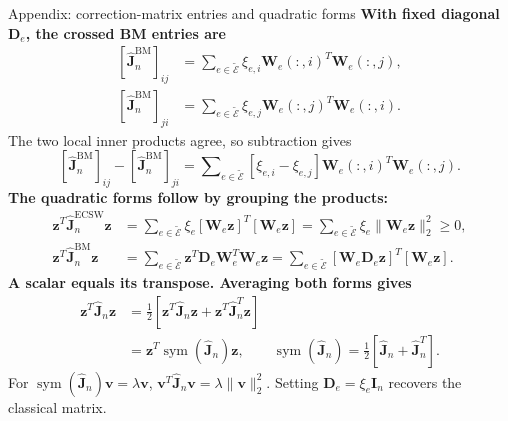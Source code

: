 \documentclass[aspectratio=169]{beamer}
\newcommand{\vect}[1]{\boldsymbol{#1}}
\newcommand{\matr}[1]{\boldsymbol{#1}}
\begin{document}
\begin{frame}{Appendix: correction-matrix entries and quadratic forms}
\hypertarget{bmecsw-correction-calculations}{}
\fontsize{9}{10.5}\selectfont
\setlength{\parskip}{0pt}
\setlength{\abovedisplayskip}{2pt}
\setlength{\belowdisplayskip}{2pt}
\setlength{\abovedisplayshortskip}{2pt}
\setlength{\belowdisplayshortskip}{2pt}
\textbf{With fixed diagonal $\matr{D}_e$, the crossed BM entries are}
\[
\begin{aligned}
 \left[\widehat{\matr{J}}_n^{\mathrm{BM}}\right]_{ij}
 &=\sum\nolimits_{e\in\widetilde{\mathcal E}}\xi_{e,i}\matr{W}_e(:,i)^T\matr{W}_e(:,j),\\
 \left[\widehat{\matr{J}}_n^{\mathrm{BM}}\right]_{ji}
 &=\sum\nolimits_{e\in\widetilde{\mathcal E}}\xi_{e,j}\matr{W}_e(:,j)^T\matr{W}_e(:,i).
\end{aligned}
\]
The two local inner products agree, so subtraction gives
\[
 [\widehat{\matr{J}}_n^{\mathrm{BM}}]_{ij}
 -[\widehat{\matr{J}}_n^{\mathrm{BM}}]_{ji}
 =\sum\nolimits_{e\in\widetilde{\mathcal E}}[\xi_{e,i}-\xi_{e,j}]
 \matr{W}_e(:,i)^T\matr{W}_e(:,j).
\]
\textbf{The quadratic forms follow by grouping the products:}
\[
\begin{aligned}
 \vect{z}^T\widehat{\matr{J}}_n^{\mathrm{ECSW}}\vect{z}
 &=\sum\nolimits_{e\in\widetilde{\mathcal E}}\xi_e
 [\matr{W}_e\vect{z}]^T[\matr{W}_e\vect{z}]
 =\sum\nolimits_{e\in\widetilde{\mathcal E}}\xi_e\|\matr{W}_e\vect{z}\|_2^2\geq0,\\
 \vect{z}^T\widehat{\matr{J}}_n^{\mathrm{BM}}\vect{z}
 &=\sum\nolimits_{e\in\widetilde{\mathcal E}}\vect{z}^T\matr{D}_e\matr{W}_e^T\matr{W}_e\vect{z}
 =\sum\nolimits_{e\in\widetilde{\mathcal E}}
 [\matr{W}_e\matr{D}_e\vect{z}]^T[\matr{W}_e\vect{z}].
\end{aligned}
\]
\textbf{A scalar equals its transpose. Averaging both forms gives}
\[
\begin{aligned}
 \vect{z}^T\widehat{\matr{J}}_n\vect{z}
 &=\tfrac12[\vect{z}^T\widehat{\matr{J}}_n\vect{z}
            +\vect{z}^T\widehat{\matr{J}}_n^T\vect{z}]\\
 &=\vect{z}^T\operatorname{sym}(\widehat{\matr{J}}_n)\vect{z},
 \qquad \operatorname{sym}(\widehat{\matr{J}}_n)
 =\tfrac12[\widehat{\matr{J}}_n+\widehat{\matr{J}}_n^T].
\end{aligned}
\]
For $\operatorname{sym}(\widehat{\matr{J}}_n)\vect{v}=\lambda\vect{v}$,
$\vect{v}^T\widehat{\matr{J}}_n\vect{v}=\lambda\|\vect{v}\|_2^2$.
Setting $\matr{D}_e=\xi_e\matr{I}_n$ recovers the classical matrix.\par
\vfill\hfill\hyperlink{bmecsw-correction-properties}{}
\end{frame}
\end{document}
